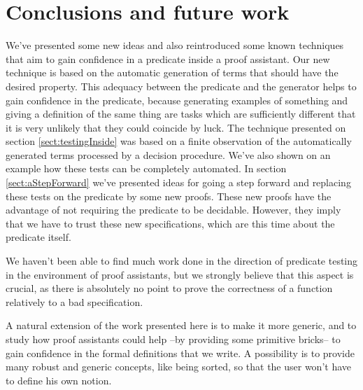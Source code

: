 \section{Conclusions and future work}


We've presented some new ideas and also reintroduced some known techniques that aim to gain confidence in a predicate inside a proof assistant. Our new technique is based on the automatic generation of terms that should have the desired property. This adequacy between the predicate and the generator helps to gain confidence in the predicate, because generating examples of something and giving a definition of the same thing are tasks which are sufficiently different that it is very unlikely that they could coincide by luck. The technique presented on section \ref{sect:testingInside} was based on a finite observation of the automatically generated terms processed by a decision procedure. We've also shown on an example how these tests can be completely automated. In section \ref{sect:aStepForward} we've presented ideas for going a step forward and replacing these tests on the predicate by some new proofs. These new proofs have the advantage of not requiring the predicate to be decidable. However, they imply that we have to trust these new specifications, which are this time about the predicate itself.

We haven't been able to find much work done in the direction of predicate testing in the environment of proof assistants, but we strongly believe that this aspect is crucial, as there is absolutely no point to prove the correctness of a function relatively to a bad specification. 

A natural extension of the work presented here is to make it more generic, and to study how proof assistants could help --by providing some primitive bricks-- to gain confidence in the formal definitions that we write. A possibility is to provide many robust and generic concepts, like being sorted, so that the user won't have to define his own notion. 